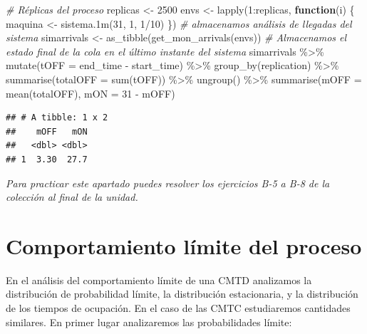 \documentclass[
]{book}
\newenvironment{Shaded}{\begin{snugshade}}{\end{snugshade}}
\newcommand{\AttributeTok}[1]{\textcolor[rgb]{0.77,0.63,0.00}{#1}}
\newcommand{\CommentTok}[1]{\textcolor[rgb]{0.56,0.35,0.01}{\textit{#1}}}
\newcommand{\ControlFlowTok}[1]{\textcolor[rgb]{0.13,0.29,0.53}{\textbf{#1}}}
\newcommand{\DecValTok}[1]{\textcolor[rgb]{0.00,0.00,0.81}{#1}}
\newcommand{\FunctionTok}[1]{\textcolor[rgb]{0.00,0.00,0.00}{#1}}
\newcommand{\NormalTok}[1]{#1}
\newcommand{\OtherTok}[1]{\textcolor[rgb]{0.56,0.35,0.01}{#1}}
\newcommand{\SpecialCharTok}[1]{\textcolor[rgb]{0.00,0.00,0.00}{#1}}
\theoremstyle{definition}
\theoremstyle{definition}
\theoremstyle{definition}
\theoremstyle{definition}
\theoremstyle{remark}
\begin{document}
\begin{Shaded}
\begin{Highlighting}[]
\CommentTok{\# Réplicas del proceso}
\NormalTok{replicas }\OtherTok{\textless{}{-}} \DecValTok{2500}
\NormalTok{envs }\OtherTok{\textless{}{-}} \FunctionTok{lapply}\NormalTok{(}\DecValTok{1}\SpecialCharTok{:}\NormalTok{replicas, }\ControlFlowTok{function}\NormalTok{(i) \{}
\NormalTok{    maquina }\OtherTok{\textless{}{-}} \FunctionTok{sistema.1m}\NormalTok{(}\DecValTok{31}\NormalTok{, }\DecValTok{1}\NormalTok{, }\DecValTok{1}\SpecialCharTok{/}\DecValTok{10}\NormalTok{)}
\NormalTok{\})}
\CommentTok{\# almacenamos análisis de llegadas del sistema}
\NormalTok{simarrivals }\OtherTok{\textless{}{-}} \FunctionTok{as\_tibble}\NormalTok{(}\FunctionTok{get\_mon\_arrivals}\NormalTok{(envs))}
\CommentTok{\# Almacenamos el estado final de la cola en el último instante del sistema}
\NormalTok{simarrivals }\SpecialCharTok{\%\textgreater{}\%}
  \FunctionTok{mutate}\NormalTok{(}\AttributeTok{tOFF =}\NormalTok{ end\_time }\SpecialCharTok{{-}}\NormalTok{ start\_time) }\SpecialCharTok{\%\textgreater{}\%}
  \FunctionTok{group\_by}\NormalTok{(replication) }\SpecialCharTok{\%\textgreater{}\%}
  \FunctionTok{summarise}\NormalTok{(}\AttributeTok{totalOFF =} \FunctionTok{sum}\NormalTok{(tOFF)) }\SpecialCharTok{\%\textgreater{}\%}
  \FunctionTok{ungroup}\NormalTok{() }\SpecialCharTok{\%\textgreater{}\%}
  \FunctionTok{summarise}\NormalTok{(}\AttributeTok{mOFF =} \FunctionTok{mean}\NormalTok{(totalOFF), }\AttributeTok{mON =} \DecValTok{31} \SpecialCharTok{{-}}\NormalTok{ mOFF)}
\end{Highlighting}
\end{Shaded}

\begin{verbatim}
## # A tibble: 1 x 2
##    mOFF   mON
##   <dbl> <dbl>
## 1  3.30  27.7
\end{verbatim}

\emph{Para practicar este apartado puedes resolver los ejercicios B-5 a B-8 de la colección al final de la unidad.}

\hypertarget{CMTCH}{%
\section{Comportamiento límite del proceso}\label{CMTCH}}

En el análisis del comportamiento límite de una CMTD analizamos la distribución de probabilidad límite, la distribución estacionaria, y la distribución de los tiempos de ocupación. En el caso de las CMTC estudiaremos cantidades similares. En primer lugar analizaremos las probabilidades límite:
\end{document}
